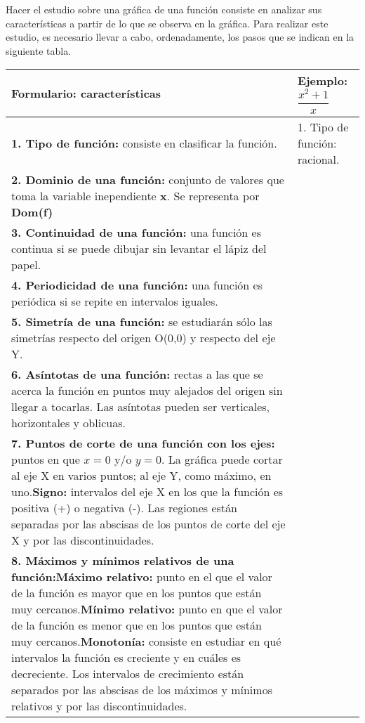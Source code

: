 Hacer el estudio sobre una gráfica de una función consiste en analizar sus características a partir de lo que se observa en la gráfica. Para realizar este estudio, es necesario llevar a cabo, ordenadamente, los pasos que se indican en la siguiente tabla.\\
\begin{table}[]
	
	\begin{tabular}{|p{5cm}|l|}
		\hline
		\textbf{Formulario: características}& \textbf{Ejemplo: } $\dfrac{x^2+1}{x}$ \\ \hline
		\textbf{1. Tipo de función:} consiste en clasificar la función. &  1. Tipo de función: racional.  \\ \hline
		\textbf{2. Dominio de una función:} conjunto de valores que toma la variable inependiente \textbf{x}. Se representa por \textbf{Dom(f)}&          \\ \hline
		\textbf{3. Continuidad de una función:} una función es continua si se puede dibujar sin levantar el lápiz del papel. &   \\ \hline
		\textbf{4. Periodicidad de una función:} una función es periódica si se repite en intervalos iguales. &          \\ \hline
		\textbf{5. Simetría de una función:} se estudiarán sólo las simetrías respecto del origen O(0,0) y respecto del eje Y. &          \\ \hline
		\textbf{6. Asíntotas de una función:} rectas a las que se acerca la función en puntos muy alejados del origen sin llegar a tocarlas. Las asíntotas pueden ser verticales, horizontales y oblicuas. &          \\ \hline
		\textbf{7. Puntos de corte de una función con los ejes:} puntos en que $x=0$ y/o $y=0$. La gráfica puede cortar al eje X en varios puntos; al eje Y, como máximo, en uno.\newline \textbf{Signo:} intervalos del eje X en los que la función es positiva (+) o negativa (-). Las regiones están separadas por las abscisas de los puntos de corte del eje X y por las discontinuidades.  &          \\ \hline
		\textbf{8. Máximos y mínimos relativos de una función:}\newline \textbf{Máximo relativo:} punto en el que el valor de la función es mayor que en los puntos que están muy cercanos.\newline \textbf{Mínimo relativo: } punto en que el valor de la función es menor que en los puntos que están muy cercanos.\newline \textbf{Monotonía: } consiste en estudiar en qué intervalos la función es creciente y en cuáles es decreciente. Los intervalos de crecimiento están separados por las abscisas de los máximos y mínimos relativos y por las discontinuidades. &          \\ \hline

\end{tabular}
\end{table}
